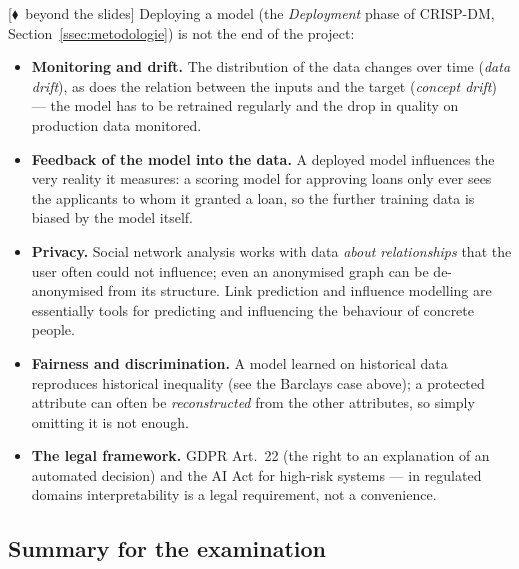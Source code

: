 \documentclass[11pt,a4paper]{article}
\theoremstyle{definition}
\newcommand{\mimo}{\textcolor{markcol}{\textsf{\footnotesize[$\blacklozenge$~beyond the slides]}}}
\begin{document}
\mimo{} Deploying a model (the \emph{Deployment} phase of CRISP-DM,
Section~\ref{ssec:metodologie}) is not the end of the project:
\begin{itemize}
\item \textbf{Monitoring and drift.} The distribution of the data changes over time (\emph{data
      drift}), as does the relation between the inputs and the target (\emph{concept drift}) --- the
      model has to be retrained regularly and the drop in quality on production data monitored.
\item \textbf{Feedback of the model into the data.} A deployed model influences the very reality it
      measures: a scoring model for approving loans only ever sees the applicants to whom it granted a
      loan, so the further training data is biased by the model itself.
\item \textbf{Privacy.} Social network analysis works with data \emph{about relationships} that the
      user often could not influence; even an anonymised graph can be de-anonymised from its
      structure. Link prediction and influence modelling are essentially tools for predicting and
      influencing the behaviour of concrete people.
\item \textbf{Fairness and discrimination.} A model learned on historical data reproduces historical
      inequality (see the Barclays case above); a protected attribute can often be
      \emph{reconstructed} from the other attributes, so simply omitting it is not enough.
\item \textbf{The legal framework.} GDPR Art.~22 (the right to an explanation of an automated
      decision) and the AI Act for high-risk systems --- in regulated domains interpretability is a
      legal requirement, not a convenience.
\end{itemize}

\subsection{Summary for the examination}
\end{document}
